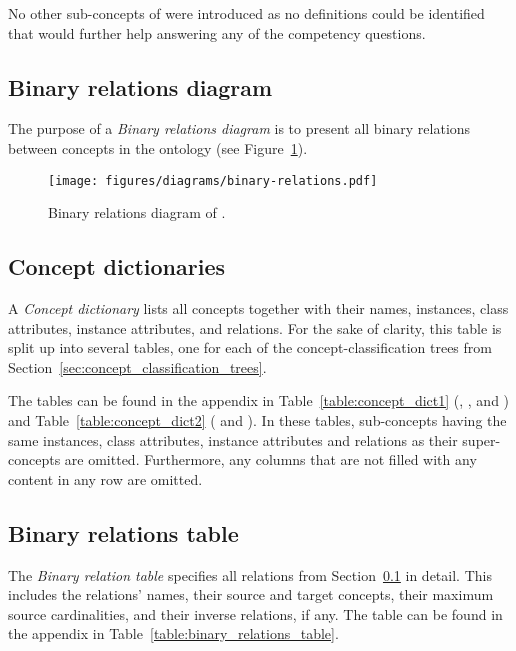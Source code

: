 No other sub-concepts of  were introduced as no definitions could be identified that would further help answering any of the competency questions.

\subsection{Binary relations diagram}
\label{subsec:binary_relations_diagram}

The purpose of a \emph{Binary relations diagram} is to present all binary relations between concepts in the ontology (see Figure~\ref{fig:binary_relations}).

\begin{figure}
  \centering
  \texttt{[image: figures/diagrams/binary-relations.pdf]}
  \caption[Binary relations diagram]{Binary relations diagram of \smarthomeweather.}
  \label{fig:binary_relations}
\end{figure}

\subsection{Concept dictionaries}
\label{subsec:concept_dictionaries}

A \emph{Concept dictionary} lists all concepts together with their names, instances, class attributes, instance attributes, and relations. For the sake of clarity, this table is split up into several tables, one for each of the concept-classification trees from Section~\ref{sec:concept_classification_trees}.

The tables can be found in the appendix in Table~\ref{table:concept_dict1} (, , and ) and Table~\ref{table:concept_dict2} ( and ). In these tables, sub-concepts having the same instances, class attributes, instance attributes and relations as their super-concepts are omitted. Furthermore, any columns that are not filled with any content in any row are omitted.

\subsection{Binary relations table}
\label{subsec:binary_relations_table}

The \emph{Binary relation table} specifies all relations from Section~\ref{subsec:binary_relations_diagram} in detail. This includes the relations' names, their source and target concepts, their maximum source cardinalities, and their inverse relations, if any. The table can be found in the appendix in Table~\ref{table:binary_relations_table}.


